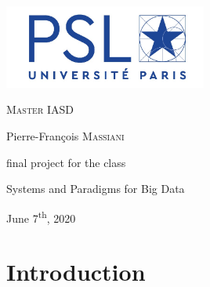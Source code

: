 \documentclass[a4paper,12pt]{article}
\begin{document}
\begin{titlepage}
	\centering
	\fbox{\begin{minipage}{\textwidth}
	\centering
	\vspace{0.3cm}
    {\scshape\LARGE\bfseries Project report\par}
	\vspace{0.2cm}
	{\Large\bfseries Connected Component Finder in MapReduce \par}
	\vspace{0.3cm}
    \end{minipage}}
	
	\vfill
	\includegraphics[width=0.5\textwidth]{fig/psl.jpg}\par\vspace{0cm}
	{\scshape\Large Master IASD \par}
	\vfill
	{\Large Pierre-François \textsc{Massiani}\par}
	\vfill
	final project for the class\par
	Systems and Paradigms for Big Data
	\vfill
    {\large June 7\textsuperscript{th}, 2020\par}
\end{titlepage}
\newpage

\section{Introduction}
\end{document}
